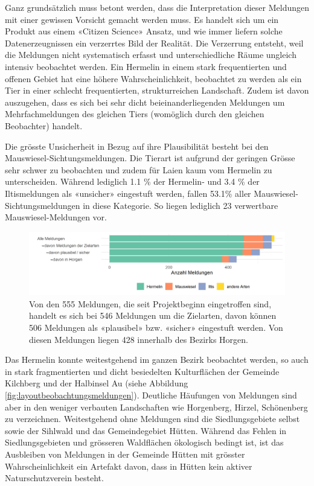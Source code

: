 \documentclass[
  oneside]{scrbook}
\begin{document}
Ganz grundsätzlich muss betont werden, dass die Interpretation dieser Meldungen mit einer gewissen Vorsicht gemacht werden muss. Es handelt sich um ein Produkt aus einem «Citizen Science» Ansatz, und wie immer liefern solche Datenerzeugnissen ein verzerrtes Bild der Realität. Die Verzerrung entsteht, weil die Meldungen nicht systematisch erfasst und unterschiedliche Räume ungleich intensiv beobachtet werden. Ein Hermelin in einem stark frequentierten und offenen Gebiet hat eine höhere Wahrscheinlichkeit, beobachtet zu werden als ein Tier in einer schlecht frequentierten, strukturreichen Landschaft. Zudem ist davon auszugehen, dass es sich bei sehr dicht beieinanderliegenden Meldungen um Mehrfachmeldungen des gleichen Tiers (womöglich durch den gleichen Beobachter) handelt.

Die grösste Unsicherheit in Bezug auf ihre Plausibilität besteht bei den Mauswiesel-Sichtungsmeldungen. Die Tierart ist aufgrund der geringen Grösse sehr schwer zu beobachten und zudem für Laien kaum vom Hermelin zu unterscheiden. Während lediglich 1.1 \% der Hermelin- und 3.4 \% der Iltismeldungen als «unsicher» eingestuft werden, fallen 53.1\% aller Mauswiesel-Sichtungsmeldungen in diese Kategorie. So liegen lediglich 23 verwertbare Mauswiesel-Meldungen vor.



\begin{figure}
\includegraphics[width=1\linewidth]{images/beobachtungsmeldungen_filter} \caption{Von den 555 Meldungen, die seit Projektbeginn eingetroffen sind, handelt es sich bei 546 Meldungen um die Zielarten, davon können 506 Meldungen als «plausibel» bzw. «sicher» eingestuft werden. Von diesen Meldungen liegen 428 innerhalb des Bezirks Horgen.}\label{fig:beobachtungsmeldungenfilter}
\end{figure}

Das Hermelin konnte weitestgehend im ganzen Bezirk beobachtet werden, so auch in stark fragmentierten und dicht besiedelten Kulturflächen der Gemeinde Kilchberg und der Halbinsel Au (siehe Abbildung \ref{fig:layoutbeobachtungsmeldungen}). Deutliche Häufungen von Meldungen sind aber in den weniger verbauten Landschaften wie Horgenberg, Hirzel, Schönenberg zu verzeichnen. Weitestgehend ohne Meldungen sind die Siedlungsgebiete selbst sowie der Sihlwald und das Gemeindegebiet Hütten. Während das Fehlen in Siedlungsgebieten und grösseren Waldflächen ökologisch bedingt ist, ist das Ausbleiben von Meldungen in der Gemeinde Hütten mit grösster Wahrscheinlichkeit ein Artefakt davon, dass in Hütten kein aktiver Naturschutzverein besteht.
\end{document}
